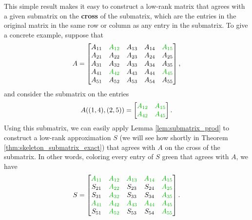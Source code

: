 \documentclass{article}
\begin{document}
	This simple result makes it easy to construct a low-rank matrix that agrees with a given submatrix on the \textbf{cross} of the submatrix, which are the entries in the original matrix in the same row or column as any entry in the submatrix. To give a concrete example, suppose that
	\begin{equation}
		A = \left[\begin{matrix}
			A_{11} & {\color{col:submat}A_{12}} & A_{13} & A_{14} & {\color{col:submat}A_{15}} \\
			A_{21} & A_{22} & A_{23} & A_{24} & A_{25} \\
			A_{31} & A_{32} & A_{33} & A_{34} & A_{35} \\
			A_{41} & {\color{col:submat}A_{42}} & A_{43} & A_{44} & {\color{col:submat}A_{45}} \\
			A_{51} & A_{52} & A_{53} & A_{54} & A_{55}
		\end{matrix}\right],
	\end{equation}
	and consider the submatrix on the  entries
	\begin{equation}
		A((1,4), (2, 5)) = \left[\begin{matrix}
			\color{col:submat}A_{12} & \color{col:submat}A_{15} \\
			\color{col:submat}A_{42} & \color{col:submat}A_{45}
		\end{matrix}\right].
	\end{equation}
	Using this submatrix, we can easily apply Lemma \ref{lem:submatrix_prod} to construct a low-rank approximation $S$ (we will see how shortly in Theorem \ref{thm:skeleton_submatrix_exact}) that agrees with $A$ on the cross of the submatrix. In other words, coloring every entry of $S$ green that agrees with $A$, we have
	\begin{equation}
		\label{eq:cross_approximation_demo}
		S = \left[\begin{matrix}
			\color{col:submat} A_{11} & \color{col:submat} A_{12} & \color{col:submat} A_{13} & \color{col:submat} A_{14} & \color{col:submat} A_{15} \\
			S_{21} & \color{col:submat} A_{22} & S_{23} & S_{24} & \color{col:submat} A_{25} \\
			S_{31} & \color{col:submat} A_{32} & S_{33} & S_{34} & \color{col:submat} A_{35} \\
			\color{col:submat} A_{41} & \color{col:submat} A_{42} & \color{col:submat} A_{43} & \color{col:submat} A_{44} & \color{col:submat} A_{45} \\
			S_{51} & \color{col:submat} A_{52} & S_{53} & S_{54} & \color{col:submat} A_{55}
		\end{matrix}\right].
	\end{equation}
	
\end{document}
